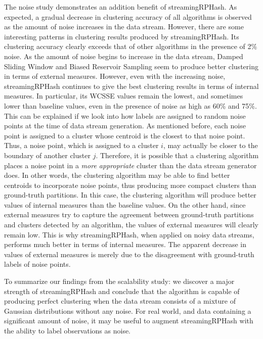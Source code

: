 The noise study demonstrates an addition benefit of \textsf{streamingRPHash}.  As expected, a
gradual decrease in clustering accuracy of all algorithms is observed as the amount of noise
increases in the data stream.  However, there are some interesting patterns in clustering results
produced by \textsf{streamingRPHash}.  Its clustering accuracy clearly exceeds that of other
algorithms in the presence of 2\% noise.  As the amount of noise begins to increase in the data
stream, Damped Sliding Window and Biased Reservoir Sampling seem to produce better clustering in
terms of external measures.  However, even with the increasing noise, \textsf{streamingRPHash}
continues to give the best clustering results in terms of internal measures.  In particular, its
WCSSE values remain the lowest, and sometimes lower than baseline values, even in the presence of
noise as high as 60\% and 75\%.  This can be explained if we look into how labels are assigned to
random noise points at the time of data stream generation.  As mentioned before, each noise point is
assigned to a cluster whose centroid is the closest to that noise point.  Thus, a noise point, which
is assigned to a cluster $i$, may actually be closer to the boundary of another cluster $j$.
Therefore, it is possible that a clustering algorithm places a noise point in a \emph{more
  appropriate} cluster than the data stream generator does.  In other words, the clustering
algorithm may be able to find better centroids to incorporate noise points, thus producing more
compact clusters than ground-truth partitions.  In this case, the clustering algorithm will produce
better values of internal measures than the baseline values.  On the other hand, since external
measures try to capture the agreement between ground-truth partitions and clusters detected by an
algorithm, the values of external measures will clearly remain low.  This is why
\textsf{streamingRPHash}, when applied on noisy data streams, performs much better in terms of
internal measures.  The apparent decrease in values of external measures is merely due to the
disagreement with ground-truth labels of noise points.

To summarize our findings from the scalability study: we discover a major strength of
\textsf{streamingRPHash} and conclude that the algorithm is capable of producing perfect clustering
when the data stream consists of a mixture of Gaussian distributions without any noise.  For real
world, and data containing a significant amount of noise, it may be useful to augment
\textsf{streamingRPHash} with the ability to label observations as noise.

